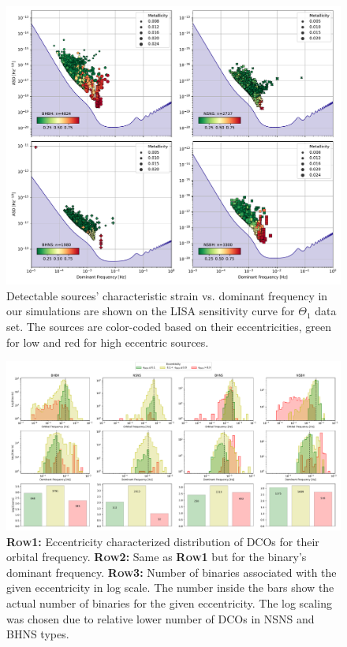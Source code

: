 \documentclass[journal, twocolumns]{IEEEtran}
\begin{document}
	 \begin{figure}[!h]%
		\centering
        \includegraphics[width=\columnwidth]{analysis_data/004__images_for_latex/dco_typewise_snr}
        \caption{Detectable sources' characteristic strain vs. dominant frequency in our simulations are shown on the LISA sensitivity curve for $\Theta_1$ data set. The sources are color-coded based on their eccentricities, green for low and red for high eccentric sources.}
		\label{fig:alldcosnrplotting}
	\end{figure}

    \begin{figure}[!h]
		\centering
        \includegraphics[width=\columnwidth]{analysis_data/004__images_for_latex/dco_fdom_ecc_details}
		\caption{\textsc{\textbf{Row1:}} Eccentricity characterized distribution of DCOs for their orbital frequency. \textsc{\textbf{Row2:}} Same as \textsc{\textbf{Row1}} but for the binary's dominant frequency. \textsc{\textbf{Row3:}} Number of binaries associated with the given eccentricity in log scale. The number inside the bars show the actual number of binaries for the given eccentricity. The log scaling was chosen due to relative lower number of DCOs in NSNS and BHNS types.}
		\label{fig:dcofdomeccdetails}
	\end{figure}
\end{document}
